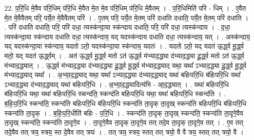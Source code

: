 \documentclass[17pt]{extarticle}
\begin{document}
22. प॒रि॒धि मे॒वैव प॑रि॒धिम् प॑रि॒धि मे॒वैत मे॒त मे॒व प॑रि॒धिम् प॑रि॒धि मे॒वैतम् । . प॒रि॒धिमिति॑ परि - धिम् । . ए॒वैत मे॒त मे॒वैवैतम् परि॒ पर्ये॒त मे॒वैवैतम् परि॑ । . ए॒तम् परि॒ पर्ये॒त मे॒तम् परि॑ दधाति दधाति॒ पर्ये॒त मे॒तम् परि॑ दधाति । . परि॑ दधाति दधाति॒ परि॒ परि॑ दधा॒ त्यस्क॑न्दा॒या स्क॑न्दाय दधाति॒ परि॒ परि॑ दधा॒ त्यस्क॑न्दाय । . द॒धा॒ त्यस्क॑न्दा॒या स्क॑न्दाय दधाति दधा॒ त्यस्क॑न्दाय॒ यद् यदस्क॑न्दाय दधाति दधा॒ त्यस्क॑न्दाय॒ यत् । . अस्क॑न्दाय॒ यद् यदस्क॑न्दा॒या स्क॑न्दाय॒ यदतो ऽतो॒ यदस्क॑न्दा॒या स्क॑न्दाय॒ यदतः॑ । . यदतो ऽतो॒ यद् यदत॑ ऊ॒र्द्ध्व मू॒र्द्ध्व मतो॒ यद् यदत॑ ऊ॒र्द्ध्वम् । . अत॑ ऊ॒र्द्ध्व मू॒र्द्ध्व मतो ऽत॑ ऊ॒र्द्ध्व म॑भ्याद॒द्ध्या द॑भ्याद॒द्ध्या दू॒र्द्ध्व मतो ऽत॑ ऊ॒र्द्ध्व म॑भ्याद॒द्ध्यात् । . ऊ॒र्द्ध्व म॑भ्याद॒द्ध्या द॑भ्याद॒द्ध्या दू॒र्द्ध्व मू॒र्द्ध्व म॑भ्याद॒द्ध्याद् यथा॒ यथा᳚ ऽभ्याद॒द्ध्या दू॒र्द्ध्व मू॒र्द्ध्व म॑भ्याद॒द्ध्याद् यथा᳚ । . अ॒भ्या॒द॒द्ध्याद् यथा॒ यथा᳚ ऽभ्याद॒द्ध्या द॑भ्याद॒द्ध्याद् यथा॑ बहिःपरि॒धि ब॑हिःपरि॒धि यथा᳚ ऽभ्याद॒द्ध्या द॑भ्याद॒द्ध्याद् यथा॑ बहिःपरि॒धि । . अ॒भ्या॒द॒द्ध्यादित्य॑भि - आ॒द॒द्ध्यात् । . यथा॑ बहिःपरि॒धि ब॑हिःपरि॒धि यथा॒ यथा॑ बहिःपरि॒धि स्कन्द॑ति॒ स्कन्द॑ति बहिःपरि॒धि यथा॒ यथा॑ बहिःपरि॒धि स्कन्द॑ति । . ब॒हिः॒प॒रि॒धि स्कन्द॑ति॒ स्कन्द॑ति बहिःपरि॒धि ब॑हिःपरि॒धि स्कन्द॑ति ता॒दृक् ता॒दृख् स्कन्द॑ति बहिःपरि॒धि ब॑हिःपरि॒धि स्कन्द॑ति ता॒दृक् । . ब॒हिः॒प॒रि॒धीति॑ बहिः - प॒रि॒धि । . स्कन्द॑ति ता॒दृक् ता॒दृख् स्कन्द॑ति॒ स्कन्द॑ति ता॒दृगे॒वैव ता॒दृख् स्कन्द॑ति॒ स्कन्द॑ति ता॒दृगे॒व । . ता॒दृगे॒वैव ता॒दृक् ता॒दृगे॒व तत् तदे॒व ता॒दृक् ता॒दृगे॒व तत् । . ए॒व तत् तदे॒वैव तत् त्रय॒ स्त्रय॒ स्त दे॒वैव तत् त्रयः॑ । . तत् त्रय॒ स्त्रय॒ स्तत् तत् त्रयो॒ वै वै त्रय॒ स्तत् तत् त्रयो॒ वै । \newline
\end{document}

